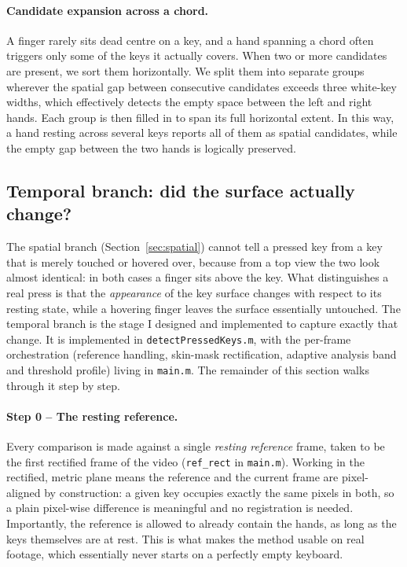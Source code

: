 \documentclass[11pt]{article}
\begin{document}
\paragraph{Candidate expansion across a chord.}
A finger rarely sits dead centre on a key, and a hand spanning a chord often
triggers only some of the keys it actually covers. When two or more candidates
are present, we sort them horizontally. We split them into separate groups wherever 
the spatial gap between consecutive candidates exceeds three white-key widths, 
which effectively detects the empty space between the left and right hands. 
Each group is then filled in to span its full horizontal extent. In this way, a hand 
resting across several keys reports all of them as spatial candidates, while the 
empty gap between the two hands is logically preserved.

\subsection{Temporal branch: did the surface actually change?}
\label{sec:temporal}
The spatial branch (Section~\ref{sec:spatial}) cannot tell a pressed key from a
key that is merely touched or hovered over, because from a top view the two look
almost identical: in both cases a finger sits above the key. What distinguishes a
real press is that the \emph{appearance} of the key surface changes with respect
to its resting state, while a hovering finger leaves the surface essentially
untouched. The temporal branch is the stage I designed and implemented to capture
exactly that change. It is implemented in \texttt{detectPressedKeys.m}, with the
per-frame orchestration (reference handling, skin-mask rectification, adaptive
analysis band and threshold profile) living in \texttt{main.m}. The remainder of
this section walks through it step by step.

\paragraph{Step 0 -- The resting reference.}
Every comparison is made against a single \emph{resting reference} frame, taken to
be the first rectified frame of the video (\texttt{ref\_rect} in
\texttt{main.m}). Working in the rectified, metric plane means the reference and
the current frame are pixel-aligned by construction: a given key occupies exactly
the same pixels in both, so a plain pixel-wise difference is meaningful and no
registration is needed. Importantly, the reference is allowed to already contain
the hands, as long as the keys themselves are at rest. This is what makes the
method usable on real footage, which essentially never starts on a perfectly empty
keyboard.
\end{document}
